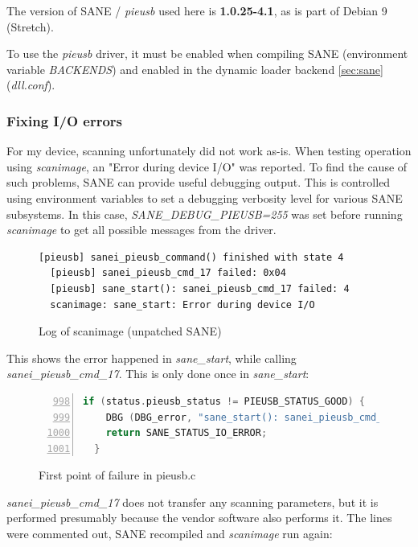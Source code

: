 \documentclass{article}
\begin{document}
The version of SANE / {\it pieusb} used here is {\bf 1.0.25-4.1}, as is part of
Debian 9 (Stretch).

To use the {\it pieusb} driver, it must be enabled when compiling SANE
(environment variable {\it BACKENDS}) and enabled in the dynamic loader backend
\autoref{sec:sane} ({\it dll.conf}).

\subsubsection{Fixing I/O errors}

For my device, scanning unfortunately did not work as-is. When testing operation
using {\it scanimage}, an "Error during device I/O" was reported. To find the
cause of such problems, SANE can provide useful debugging output. This is controlled
using environment variables to set a debugging verbosity level for various SANE
subsystems. In this case, {\it SANE\_DEBUG\_PIEUSB=255} was set before running
{\it scanimage} to get all possible messages from the driver.

\begin{figure}[H]
  \caption{Log of scanimage (unpatched SANE)}
  \begin{lstlisting}[language={}]
  [pieusb] sanei_pieusb_command() finished with state 4
  [pieusb] sanei_pieusb_cmd_17 failed: 0x04
  [pieusb] sane_start(): sanei_pieusb_cmd_17 failed: 4
  scanimage: sane_start: Error during device I/O
  \end{lstlisting}
\end{figure}

This shows the error happened in {\it sane\_start}, while calling {\it sanei\_pieusb\_cmd\_17}.
This is only done once in {\it sane\_start}:

\begin{figure}[H]
  \caption{First point of failure in pieusb.c}
  \begin{lstlisting}[language=C, breaklines=true, numbers=left, firstnumber=998]
  if (status.pieusb_status != PIEUSB_STATUS_GOOD) {
    DBG (DBG_error, "sane_start(): sanei_pieusb_cmd_17 failed: %d\n", status.pieusb_status);
    return SANE_STATUS_IO_ERROR;
  }
  \end{lstlisting}
\end{figure}

{\it sanei\_pieusb\_cmd\_17} does not transfer any scanning parameters, but it is
performed presumably because the vendor software also performs it. The lines
were commented out, SANE recompiled and {\it scanimage} run again:
\end{document}
